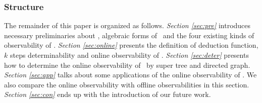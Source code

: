 \subsubsection*{Structure}
The remainder of this paper is organized as follows. {\em Section \ref{sec:pre}} introduces necessary preliminaries about \BCNs, algebraic forms of \BCNs\ and the four existing kinds of observability of  \BCNs. {\em Section \ref{sec:online}} presents the definition of deduction function, $k$ steps determinability and online observability of \BCNs. {\em Section \ref{sec:deter}} presents how to determine the online observability of \BCNs\ by super tree and directed graph. {\em Section \ref{sec:app}} talks about some applications of the online observability of \BCNs. We also compare the online observability with offline observabilities in this section. {\em Section \ref{sec:con}} ends up  with the introduction of our future work.


